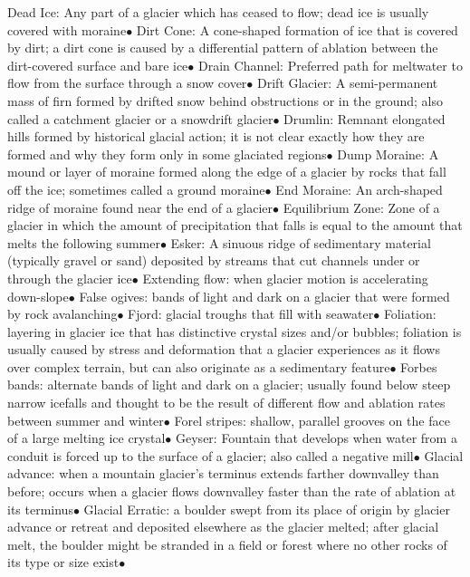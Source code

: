 \documentclass{article}
\newcommand{\ddd}{$\bullet$}
\begin{document}
\begin{multicols*}{4}
        Dead Ice: Any part of a glacier which has ceased to flow; dead ice is usually covered with moraine\ddd
        Dirt Cone: A cone-shaped formation of ice that is covered by dirt; a dirt cone is caused by a differential pattern of ablation between the dirt-covered surface and bare ice\ddd
        Drain Channel: Preferred path for meltwater to flow from the surface through a snow cover\ddd
        Drift Glacier: A semi-permanent mass of firn formed by drifted snow behind obstructions or in the ground; also called a catchment glacier or a snowdrift glacier\ddd
        Drumlin: Remnant elongated hills formed by historical glacial action; it is not clear exactly how they are formed and why they form only in some glaciated regions\ddd
        Dump Moraine: A mound or layer of moraine formed along the edge of a glacier by rocks that fall off the ice; sometimes called a ground moraine\ddd
        End Moraine: An arch-shaped ridge of moraine found near the end of a glacier\ddd
        Equilibrium Zone: Zone of a glacier in which the amount of precipitation that falls is equal to the amount that melts the following summer\ddd
        Esker: A sinuous ridge of sedimentary material (typically gravel or sand) deposited by streams that cut channels under or through the glacier ice\ddd
        Extending flow: when glacier motion is accelerating down-slope\ddd
        False ogives: bands of light and dark on a glacier that were formed by rock avalanching\ddd
        Fjord: glacial troughs that fill with seawater\ddd
        Foliation: layering in glacier ice that has distinctive crystal sizes and/or bubbles; foliation is usually caused by stress and deformation that a glacier experiences as it flows over complex terrain, but can also originate as a sedimentary feature\ddd
        Forbes bands: alternate bands of light and dark on a glacier; usually found below steep narrow icefalls and thought to be the result of different flow and ablation rates between summer and winter\ddd
        Forel stripes: shallow, parallel grooves on the face of a large melting ice crystal\ddd 
        Geyser: Fountain that develops when water from a conduit is forced up to the surface of a glacier; also called a negative mill\ddd
        Glacial advance: when a mountain glacier's terminus extends farther downvalley than before; occurs when a glacier flows downvalley faster than the rate of ablation at its terminus\ddd
        Glacial Erratic: a boulder swept from its place of origin by glacier advance or retreat and deposited elsewhere as the glacier melted; after glacial melt, the boulder might be stranded in a field or forest where no other rocks of its type or size exist\ddd

\end{multicols*}
\end{document}
